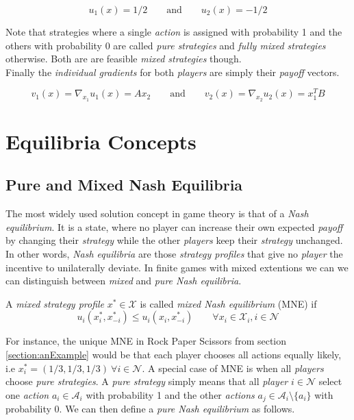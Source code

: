\begin{equation*}
    u_1(x) = 1/2  \qquad \text{and} \qquad u_2(x) = -1/2
\end{equation*}

Note that strategies where a single \textit{action} is assigned with probability 1 and the others with probability 0 are called \textit{pure strategies} and \textit{fully mixed strategies} otherwise. Both are are feasible \textit{mixed strategies} though. \\ 

Finally the \textit{individual gradients} for both \textit{players} are simply their \textit{payoff} vectors.

\begin{equation*}
    v_1(x) = \nabla_{x_1}u_1(x) = Ax_2 \qquad \text{and} \qquad v_2(x) = \nabla_{x_2}u_2(x) = x_{1}^{T}B
\end{equation*}


\section{Equilibria Concepts}\label{section:equilibriaConcepts}


\subsection{Pure and Mixed Nash Equilibria}\label{subsection:PNEandMNE}
The most widely used solution concept in game theory is that of a \textit{Nash equilibrium}. It is a state, where no player can increase their own expected \textit{payoff} by changing their \textit{strategy} while the other \textit{players} keep their \textit{strategy} unchanged. In other words, \textit{Nash equilibria} are those \textit{strategy profiles} that give no \textit{player} the incentive to unilaterally deviate. In finite games with mixed extentions we can we can distinguish between \textit{mixed} and \textit{pure Nash equilibria}. 

\begin{definition}\label{def:MNE}
A \textit{mixed strategy profile} $x^* \in \mathcal{X}$ is called \textit{mixed Nash equilibrium} (MNE) if
    \[u_i(x_{i}^{*},x_{-i}^{*}) \le  u_i(x_{i},x_{-i}^{*}) \qquad \forall x_i \in \mathcal{X}_i, i \in \mathcal{N}\]
\end{definition}

For instance, the unique MNE in Rock Paper Scissors from section \ref{section:anExample} would be that each player chooses all actions equally likely, i.e $x_{i}^{*} = (1/3,1/3,1/3) \ \forall i \in \mathcal{N}$. A special case of MNE is when all \textit{players} choose \textit{pure strategies}. A \textit{pure strategy} simply means that all \textit{player} $i \in \mathcal{N}$ select one \textit{action} $a_i \in \mathcal{A}_i$ with probability 1 and the other \textit{actions} $a_j \in \mathcal{A}_i \setminus \{a_i\}$ with probability 0. We can then define a \textit{pure Nash equilibrium} as follows.

